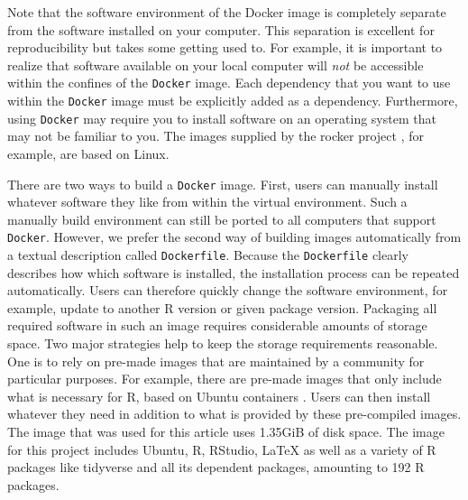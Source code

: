 \documentclass[psych,tutorial,submit,moreauthors,pdftex]{mdpi}
\begin{document}
Note that the software environment of the Docker image is completely
separate from the software installed on your computer. This separation
is excellent for reproducibility but takes some getting used to. For
example, it is important to realize that software available on your
local computer will \emph{not} be accessible within the confines of the
\texttt{Docker} image. Each dependency that you want to use within the
\texttt{Docker} image must be explicitly added as a dependency.
Furthermore, using \texttt{Docker} may require you to install software
on an operating system that may not be familiar to you. The images
supplied by the rocker project
\citep{boettigerIntroductionRockerDocker2017}, for example, are based on
Linux.

There are two ways to build a \texttt{Docker} image. First, users can
manually install whatever software they like from within the virtual
environment. Such a manually build environment can still be ported to
all computers that support \texttt{Docker}. However, we prefer the
second way of building images automatically from a textual description
called \texttt{Dockerfile}. Because the \texttt{Dockerfile} clearly
describes how which software is installed, the installation process can
be repeated automatically. Users can therefore quickly change the
software environment, for example, update to another R version or given
package version. Packaging all required software in such an image
requires considerable amounts of storage space. Two major strategies
help to keep the storage requirements reasonable. One is to rely on
pre-made images that are maintained by a community for particular
purposes. For example, there are pre-made images that only include what
is necessary for R, based on Ubuntu containers
\citep{boettigerIntroductionRockerDocker2017}. Users can then install
whatever they need in addition to what is provided by these pre-compiled
images. The image that was used for this article uses 1.35GiB of disk
space. The image for this project includes Ubuntu, R, RStudio, LaTeX as
well as a variety of R packages like tidyverse \citep{tidyverse} and all
its dependent packages, amounting to 192 R packages.
\end{document}
